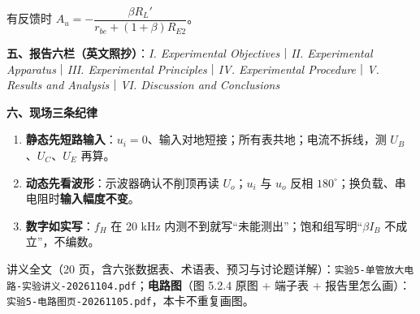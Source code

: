 \documentclass[10pt]{ctexart}
\begin{document}
有反馈时 $A_u=-\dfrac{\beta R_L'}{r_{be}+(1+\beta)R_{E2}}$。

\textbf{\color{violetdeep}五、报告六栏（英文照抄）}：\textit{I. Experimental Objectives}｜\textit{II. Experimental Apparatus}｜\textit{III. Experimental Principles}｜\textit{IV. Experimental Procedure}｜\textit{V. Results and Analysis}｜\textit{VI. Discussion and Conclusions}

\textbf{\color{violetdeep}六、现场三条纪律}

\begin{enumerate}
\item \textbf{静态先短路输入}：$u_i=0$、输入对地短接；所有表共地；电流不拆线，测 $U_B$、$U_C$、$U_E$ 再算。
\item \textbf{动态先看波形}：示波器确认不削顶再读 $U_o$；$u_i$ 与 $u_o$ 反相 $180^\circ$；换负载、串电阻时\textbf{输入幅度不变}。
\item \textbf{数字如实写}：$f_H$ 在 20 kHz 内测不到就写“未能测出”；饱和组写明“$\beta I_B$ 不成立”，不编数。
\end{enumerate}

\vspace{2pt}
{\small\color{inkgray} 讲义全文（20 页，含六张数据表、术语表、预习与讨论题详解）：\texttt{实验5-单管放大电路-实验讲义-20261104.pdf}；\textbf{电路图}（图 5.2.4 原图 + 端子表 + 报告里怎么画）：\texttt{实验5-电路图页-20261105.pdf}，本卡不重复画图。}
\end{document}
